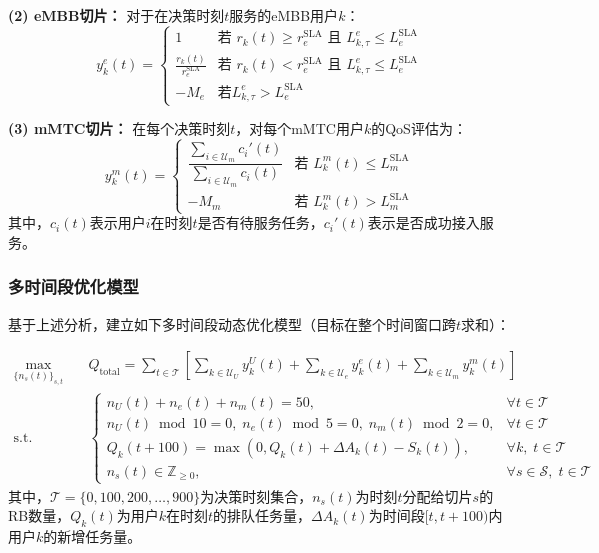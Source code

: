 \textbf{(2) eMBB切片：}
对于在决策时刻$t$服务的eMBB用户$k$：
\begin{equation}
y_{k}^{e}(t) = \begin{cases}
1 & \text{若 } r_k(t) \geq r_{e}^{\text{SLA}} \text{ 且 } L_{k,\tau}^{e} \leq L_{e}^{\text{SLA}} \\
\frac{r_k(t)}{r_{e}^{\text{SLA}}} & \text{若 } r_k(t) < r_{e}^{\text{SLA}} \text{ 且 } L_{k,\tau}^{e} \leq L_{e}^{\text{SLA}} \\
-M_{e} & \text{若} L_{k,\tau}^{e} > L_{e}^{\text{SLA}}
\end{cases}
\end{equation}

\textbf{(3) mMTC切片：}
在每个决策时刻$t$，对每个mMTC用户$k$的QoS评估为：
\begin{equation}
y_k^{m}(t) = \begin{cases}
\dfrac{\sum_{i \in \mathcal{U}_{m}} c_i'(t)}{\sum_{i \in \mathcal{U}_{m}} c_i(t)} & \text{若 } L_k^{m}(t) \le L_{m}^{\text{SLA}} \\
-M_{m} & \text{若 } L_k^{m}(t) > L_{m}^{\text{SLA}}
\end{cases}
\end{equation}
其中，$c_i(t)$表示用户$i$在时刻$t$是否有待服务任务，$c_i'(t)$表示是否成功接入服务。

\subsubsection{多时间段优化模型}
 
基于上述分析，建立如下多时间段动态优化模型（目标在整个时间窗口跨$t$求和）：

\begin{equation}
\begin{aligned}
\max_{\{n_s(t)\}_{s,t}} \quad & Q_{\text{total}} = \sum_{t \in \mathcal{T}} \left[ \sum_{k \in \mathcal{U}_U} y_{k}^{U}(t) + \sum_{k \in \mathcal{U}_e} y_{k}^{e}(t) + \sum_{k \in \mathcal{U}_m} y_{k}^{m}(t) \right]\\
\text{s.t.} \quad & \begin{cases}
 n_U(t) + n_e(t) + n_m(t) = 50, & \forall t \in \mathcal{T} \\
 n_U(t) \bmod 10 = 0,\; n_e(t) \bmod 5 = 0,\; n_m(t) \bmod 2 = 0, & \forall t \in \mathcal{T} \\
 Q_k(t+100) = \max\!\left(0, Q_k(t) + \Delta A_k(t) - S_k(t)\right), & \forall k,\; t \in \mathcal{T} \\
 n_s(t) \in \mathbb{Z}_{\ge 0}, & \forall s \in \mathcal{S},\; t \in \mathcal{T}
 \end{cases}
 \end{aligned}
 \end{equation}
其中，$\mathcal{T} = \{0, 100, 200, \ldots, 900\}$为决策时刻集合，$n_s(t)$为时刻$t$分配给切片$s$的RB数量，$Q_k(t)$为用户$k$在时刻$t$的排队任务量，$\Delta A_k(t)$为时间段$[t, t+100)$内用户$k$的新增任务量。

